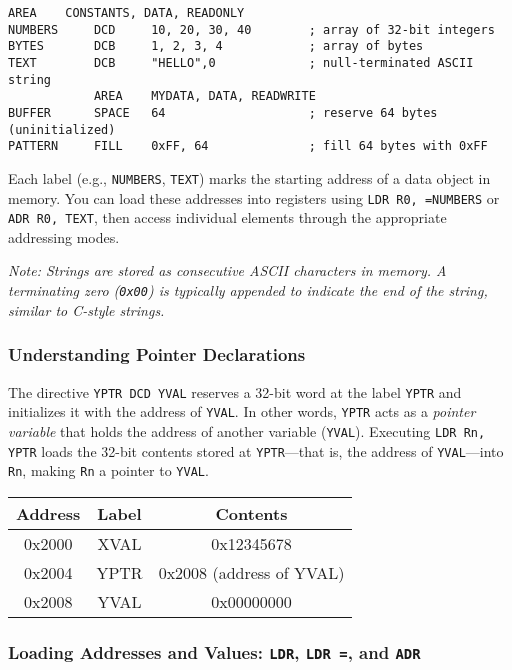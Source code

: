 \begin{lstlisting}[caption={Declaring arrays and strings in memory}]
            AREA    CONSTANTS, DATA, READONLY
NUMBERS     DCD     10, 20, 30, 40        ; array of 32-bit integers
BYTES       DCB     1, 2, 3, 4            ; array of bytes
TEXT        DCB     "HELLO",0             ; null-terminated ASCII string
            AREA    MYDATA, DATA, READWRITE
BUFFER      SPACE   64                    ; reserve 64 bytes (uninitialized)
PATTERN     FILL    0xFF, 64              ; fill 64 bytes with 0xFF
\end{lstlisting}

Each label (e.g., \texttt{NUMBERS}, \texttt{TEXT}) marks the starting address of a data object in memory.  
You can load these addresses into registers using \texttt{LDR R0, =NUMBERS} or \texttt{ADR R0, TEXT}, then access individual elements through the appropriate addressing modes.

\noindent\textit{Note: Strings are stored as consecutive ASCII characters in memory. A terminating zero (\texttt{0x00}) is typically appended to indicate the end of the string, similar to C-style strings.}
\subsubsection{Understanding Pointer Declarations}
The directive \texttt{YPTR DCD YVAL} reserves a 32-bit word at the label \texttt{YPTR} and initializes it with the address of \texttt{YVAL}.  
In other words, \texttt{YPTR} acts as a \emph{pointer variable} that holds the address of another variable (\texttt{YVAL}).  
Executing \texttt{LDR Rn, YPTR} loads the 32-bit contents stored at \texttt{YPTR}—that is, the address of \texttt{YVAL}—into \texttt{Rn}, making \texttt{Rn} a pointer to \texttt{YVAL}.


\begin{center}
\begin{tabular}{|c|c|c|}
\hline
\textbf{Address} & \textbf{Label} & \textbf{Contents} \\
\hline
0x2000 & XVAL & 0x12345678 \\
0x2004 & YPTR & 0x2008 (address of YVAL) \\
0x2008 & YVAL & 0x00000000 \\
\hline
\end{tabular}
\end{center}


\subsubsection{Loading Addresses and Values: \texttt{LDR}, \texttt{LDR =}, and \texttt{ADR}}


